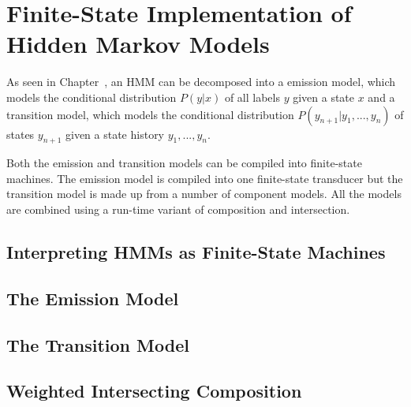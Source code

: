 \section{Finite-State Implementation of Hidden Markov Models}
As seen in Chapter~\cite{chapter:hmm}, an HMM can be decomposed into a
emission model, which models the conditional distribution $P(y|x)$ of
all labels $y$ given a state $x$ and a transition model, which models
the conditional distribution $P(y_{n+1} | y_1, ..., y_n)$ of states
$y_{n+1}$ given a state history $y_1, ..., y_n$.

Both the emission and transition models can be compiled into
finite-state machines. The emission model is compiled into one
finite-state transducer but the transition model is made up from a
number of component models. All the models are combined using a
run-time variant of composition and intersection.

\subsection{Interpreting HMMs as Finite-State Machines}

\subsection{The Emission Model}

\subsection{The Transition Model}

\subsection{Weighted Intersecting Composition}